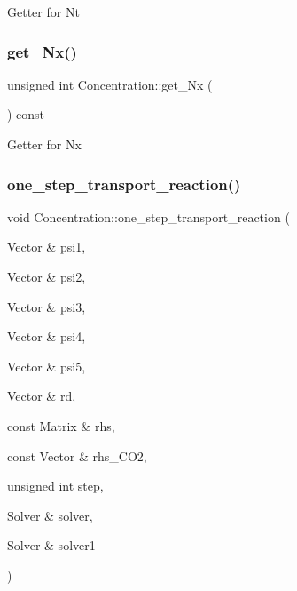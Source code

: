 Getter for Nt \mbox{\label{classConcentration_aba844806c75ec258a0f2aeb8a4f94daa}} 
\subsubsection{\texorpdfstring{get\+\_\+\+Nx()}{get\_Nx()}}
{\footnotesize\ttfamily unsigned int Concentration\+::get\+\_\+\+Nx (\begin{DoxyParamCaption}{ }\end{DoxyParamCaption}) const}

Getter for Nx \mbox{\label{classConcentration_a6ad7f6581bc6d2154584c97c247e75cf}} 
\subsubsection{\texorpdfstring{one\+\_\+step\+\_\+transport\+\_\+reaction()}{one\_step\_transport\_reaction()}}
{\footnotesize\ttfamily void Concentration\+::one\+\_\+step\+\_\+transport\+\_\+reaction (\begin{DoxyParamCaption}\item[{Vector \&}]{psi1,  }\item[{Vector \&}]{psi2,  }\item[{Vector \&}]{psi3,  }\item[{Vector \&}]{psi4,  }\item[{Vector \&}]{psi5,  }\item[{Vector \&}]{rd,  }\item[{const Matrix \&}]{rhs,  }\item[{const Vector \&}]{rhs\+\_\+\+C\+O2,  }\item[{unsigned int}]{step,  }\item[{Solver \&}]{solver,  }\item[{Solver \&}]{solver1 }\end{DoxyParamCaption})}

